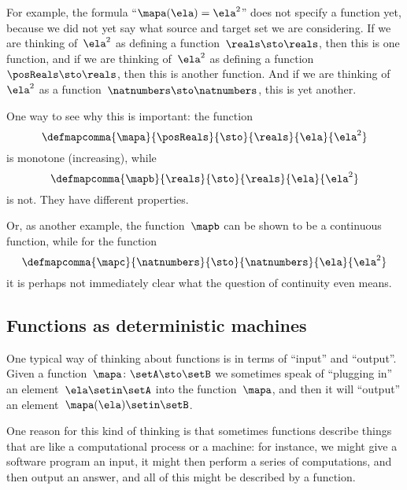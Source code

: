 For example, the formula ``$\mapa(\ela)=\ela^2$'' does not specify a function yet, because we did not yet say what source and target set we are considering.
If we are thinking of~$\ela^2$ as defining a function~$\reals \sto \reals$, then this is one function, and if we are thinking of~$\ela^2$ as defining a function~$\posReals \sto \reals$, then this is another function.
And if we are thinking of~$\ela^2$ as a function~$\natnumbers \sto \natnumbers$, this is yet another.

One way to see why this is important: the function
\begin{equation}
    \defmapcomma{
        \mapa
    }{
        \posReals
    }{
        \sto
    }{
        \reals
    }{
        \ela
    }{
        \ela^2
    }
\end{equation}
is monotone (increasing), while
\begin{equation}
    \defmapcomma{
        \mapb
    }{
        \reals
    }{
        \sto
    }{
        \reals
    }{
        \ela
    }{
        \ela^2
    }
\end{equation}
is not.
They have different properties.

Or, as another example, the function~$\mapb$ can be shown to be a continuous function, while for the function
\begin{equation}
    \defmapcomma{
        \mapc
    }{
        \natnumbers
    }{
        \sto
    }{
        \natnumbers
    }{
        \ela
    }{
        \ela^2
    }
\end{equation}
it is perhaps not immediately clear what the question of continuity even means.

\subsection{Functions as deterministic machines}

One typical way of thinking about functions is in terms of ``input'' and ``output''.
Given a function~$\mapa\colon \setA \sto \setB$ we sometimes speak of ``plugging in'' an element~$\ela \setin\setA$ into the function~$\mapa$, and then it will ``output'' an element~$\mapa(\ela) \setin\setB$.

One reason for this kind of thinking is that sometimes functions describe things that are like a computational process or a machine:
for instance, we might give a software program an input, it might then perform a series of computations, and then output an answer, and all of this might be described by a function.

